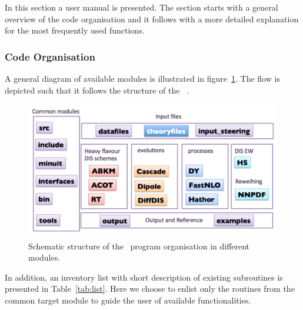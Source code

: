 \label{sec:man}
In this section a user manual is presented. The section starts with a general overview of the code
organisation and it follows with a more detailed explanation for the most frequently used functions.

\subsubsection{Code Organisation}
A general diagram of  available modules is illustrated in figure~\ref{fig:org}.
The flow is depicted such that it follows the structure of the \fitter\ .
\begin{figure}
\begin{center}
\includegraphics[width=0.75\linewidth]{figures/organisation.pdf}
\end{center}
\caption{Schematic structure of the \fitter\ program organisation in different modules.}
\label{fig:org}
\end{figure}

In addition, an inventory list with short description of existing subroutines is  
presented in Table~\ref{tab:list}. 
Here we choose to enlist only the routines from the common target module to guide 
the user of available functionalities.

